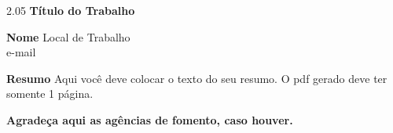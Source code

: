 \documentclass[11pt,a4paper]{article}
\numberwithin{equation}{section}
\begin{document}
\begin{center}
\begin{spacing}{2.05}
{\fontsize{20}{20}
\bf
Título do Trabalho
}
\end{spacing}
\end{center}
\vspace{-1.25cm}
\begin{center}
{\fontsize{14}{20}
\bf
Nome }
\bigskip
{\fontsize{12}{20}
Local de Trabalho \\
e-mail
}
\end{center}
\vspace{10pt}
{\fontsize{16}{20}
\bf
Resumo
}
\medskip
Aqui você deve colocar o texto do seu resumo. O pdf gerado deve ter somente 1 página.
\vspace{2cm}
\begin{flushright}
{\bf
Agradeça aqui as agências de fomento, caso houver.
}
\end{flushright}
\end{document}
